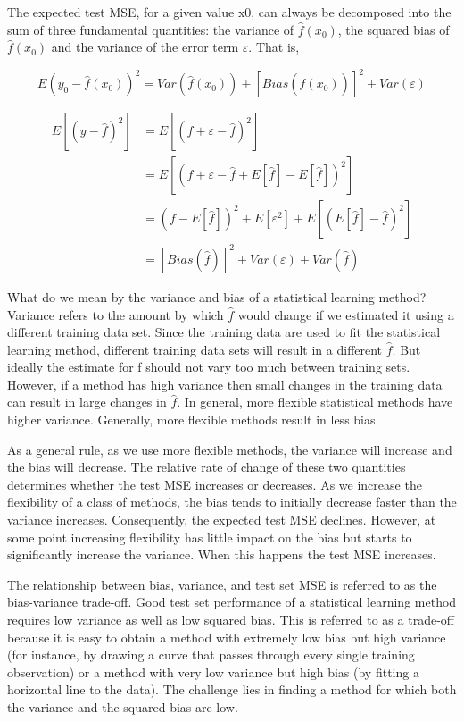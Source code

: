 \documentclass{article}
\theoremstyle{definition}
\theoremstyle{remark}
\begin{document}
	The expected test MSE, for a given value x0, can always be decomposed into the sum of three fundamental quantities: the variance of $\hat{f}(x_0)$, the squared bias of $\hat{f}(x_0)$ and the variance of the error term $\varepsilon$. That is,
	
	\[
	E(y_0-\hat{f}(x_0))^2=Var(\hat{f}(x_0))+[Bias(\hat{f}(x_0))]^2+Var(\varepsilon)
	\]
	
	\begin{equation*}
		\begin{split}
			E[(y-\hat{f})^2]&=E[(f+\varepsilon-\hat{f})^2]\\
		&=E[(f+\varepsilon-\hat{f}+E[\hat{f}]-E[\hat{f}])^2]\\
		&=(f-E[\hat{f}])^2+E[\varepsilon^2]+E[(E[\hat{f}]-\hat{f})^2]\\
		&=[Bias(\hat{f})]^2+Var(\varepsilon)+Var(\hat{f})
		\end{split}
	\end{equation*}
	
	What do we mean by the variance and bias of a statistical learning method? Variance refers to the amount by which $\hat{f}$ would change if we estimated it using a different training data set. Since the training data are used to fit the statistical learning method, different training data sets will result in a different $\hat{f}$. But ideally the estimate for f should not vary too much between training sets. However, if a method has high variance then small changes in the training data can result in large changes in $\hat{f}$. In general, more flexible statistical methods have higher variance. Generally, more flexible methods result in less bias.
	
	As a general rule, as we use more flexible methods, the variance will increase and the bias will decrease. The relative rate of change of these two quantities determines whether the test MSE increases or decreases. As we increase the flexibility of a class of methods, the bias tends to initially decrease faster than the variance increases. Consequently, the expected test MSE declines. However, at some point increasing flexibility has little impact on the bias but starts to significantly increase the variance. When this happens the test MSE increases.
	
	The relationship between bias, variance, and test set MSE is referred to as the bias-variance trade-off. Good test set performance of a statistical learning method requires low variance as well as low squared bias. This is referred to as a trade-off because it is easy to obtain a method with extremely low bias but high variance (for instance, by drawing a curve that passes through every single training observation) or a method with very low variance but high bias (by fitting a horizontal line to the data). The challenge lies in finding a method for which both the variance and the squared bias are low. 
	
\end{document}
